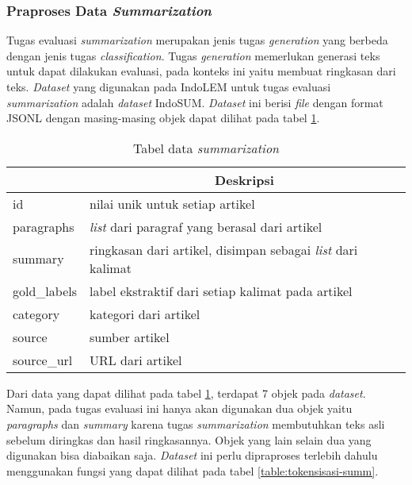 \subsubsection{Praproses Data \textit{Summarization}}

Tugas evaluasi \textit{summarization} merupakan jenis tugas \textit{generation} yang berbeda dengan jenis tugas \textit{classification}. Tugas \textit{generation} memerlukan generasi teks untuk dapat dilakukan evaluasi, pada konteks ini yaitu membuat ringkasan dari teks. \textit{Dataset} yang digunakan pada IndoLEM untuk tugas evaluasi \textit{summarization} adalah \textit{dataset} IndoSUM. \textit{Dataset} ini berisi \textit{file} dengan format JSONL dengan masing-masing objek dapat dilihat pada tabel \ref{table:data-summarization}.

\begin{table}
    \vspace{0.25cm}
    \caption{Tabel data \textit{summarization}}
    \label{table:data-summarization}
    \begin{center}
        \begin{tabular}{|l|l|}
            \hline \rowcolor{black!10}
            \multicolumn{1}{|c|}{\textbf{Objek}} & \multicolumn{1}{|c|}{\textbf{Deskripsi}} \\ \hline
            id & nilai unik untuk setiap artikel \\ \hline
            paragraphs & \textit{list} dari paragraf yang berasal dari artikel \\ \hline
            summary & ringkasan dari artikel, disimpan sebagai \textit{list} dari kalimat \\ \hline 
            gold\_labels & label ekstraktif dari setiap kalimat pada artikel \\ \hline
            category & kategori dari artikel \\ \hline
            source & sumber artikel \\ \hline
            source\_url & URL dari artikel \\ \hline
        \end{tabular}
    \end{center}
\end{table}

Dari data yang dapat dilihat pada tabel \ref{table:data-summarization}, terdapat 7 objek  pada \textit{dataset}. Namun, pada tugas evaluasi ini hanya akan digunakan dua objek yaitu \textit{paragraphs} dan \textit{summary} karena tugas \textit{summarization} membutuhkan teks asli sebelum diringkas dan hasil ringkasannya. Objek yang lain selain dua yang digunakan bisa diabaikan saja. \textit{Dataset} ini perlu dipraproses terlebih dahulu menggunakan fungsi yang dapat dilihat pada tabel \ref{table:tokensisasi-summ}.

